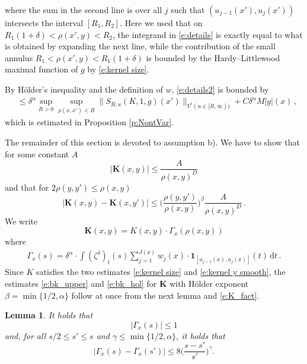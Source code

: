 \documentclass[12pt,reqno,a4paper,dvipsnames]{amsart}
\theoremstyle{plain}
\newtheorem{lemma}[theorem]{Lemma}
\theoremstyle{definition}
\numberwithin{theorem}{section}
\numberwithin{equation}{section}
\newcommand{\AD}{D}
\begin{document}
    where the sum in the second line is over all $j$ such that $(u_{j-1}(x'), u_j(x'))$ intersects the interval $[R_1, R_2]$.
    Here we used that on $R_1(1 + \delta) < \rho(x', y) < R_2$, the integrand in \eqref{e:details} is exactly equal to what is obtained by expanding the next line, while the contribution of the small annulus $R_1 < \rho(x', y) < R_1(1 + \delta)$ is bounded by the Hardy--Littlewood maximal function of $g$ by \eqref{e:kernel size}.
    
    By Hölder's inequality and the definition of $w$, \eqref{e:details2} is bounded by
    \begin{align*}
        &\le \delta^\alpha \sup_{R > 0} \sup_{\rho(x,x') < R} \|S_{R, u}(K, 1, g)(x') \|_{V^r(u \in [R, \infty))} + C \delta^\alpha M|g|(x)\,,
    \end{align*}
    which is estimated in Proposition \ref{p:NontVar}.     
    
    The remainder of this section is devoted to assumption b). We have to show that for some constant $A$
    \begin{equation}
        \label{e:bk_upper}
        |\mathbf{K}(x,y)| \le \frac{A}{\rho(x,y)^\AD}
    \end{equation}
    and that for $2\rho(y,y') \le \rho(x,y)$
    \begin{equation}
        \label{e:bk_hol}
        |\mathbf{K}(x,y) - \mathbf{K}(x,y')| \le \Big( \frac{\rho(y,y')}{\rho(x,y)}\Big)^\beta \frac{A}{\rho(x,y)^\AD}\,.
    \end{equation}
    We write
    \begin{equation}
        \label{e:K_fact}
        \mathbf{K}(x,y) = K(x,y)\cdot \Gamma_x(\rho(x,y))
    \end{equation}
    where
    \begin{align*}
        \Gamma_x(s) = \delta^\alpha \cdot \int (\zeta^\delta)_t(s) \sum_{j=1}^{J(x)} w_j(x) \cdot  \mathbf{1}_{[u_{j-1}(x), u_j(x)]}(t) \, \mathrm{d}t\,.
    \end{align*}
    Since $K$ satisfies the two estimates \eqref{e:kernel size} and \eqref{e:kernel y smooth}, the estimates \eqref{e:bk_upper} and \eqref{e:bk_hol} for $\mathbf{K}$ with Hölder exponent $\beta = \min\{1/2,\alpha\}$ follow at once from the next lemma and \eqref{e:K_fact}.

    \begin{lemma}
        \label{l:gamma}
        It holds that
        \begin{equation}
            \label{e:g_upper}
            |\Gamma_x(s)| \le 1
        \end{equation}
        and, for all $s/2 \le s' \le s$ and $\gamma \le \min\{1/2, \alpha\}$, it holds that
        \begin{equation}
            \label{e:g_hol}
            |\Gamma_x(s) - \Gamma_x(s')| \le 8 \Big(\frac{s - s'}{s'}\Big)^\gamma.
        \end{equation}
    \end{lemma}
\end{document}
